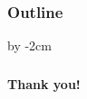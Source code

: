 \documentclass[aspectratio=1610,10pt]{beamer} %
\begin{document}

\maketitle

\begin{frame}
  \frametitle{Outline}
  \tableofcontents
\end{frame}












\topskip=2cm\advance\textheight by -2cm\enlargethispage{-1cm}


\printbibliography

\begin{frame}[c]\frametitle{}
	\centering
	\Huge \textbf{Thank you!}
\end{frame}
\end{document}

